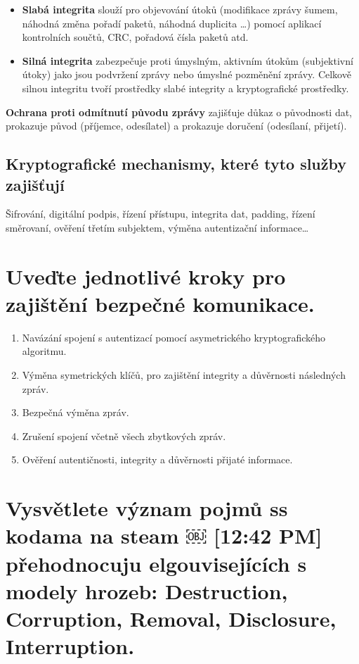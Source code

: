 \begin{itemize}
    \item \textbf{Slabá integrita} slouží pro objevování útoků (modifikace zprávy šumem, náhodná změna pořadí paketů, náhodná duplicita \dots) pomocí aplikací kontrolních součtů, CRC, pořadová čísla paketů atd.
    \item \textbf{Silná integrita} zabezpečuje proti úmyslným, aktivním útokům (subjektivní útoky) jako jsou podvržení zprávy nebo úmyslné pozměnění zprávy. Celkově silnou integritu tvoří prostředky slabé integrity a kryptografické prostředky.
\end{itemize}

\textbf{Ochrana proti odmítnutí původu zprávy} zajišťuje důkaz o původnosti dat, prokazuje původ (příjemce, odesílatel) a prokazuje doručení (odesílaní, přijetí).

\subsection{Kryptografické mechanismy, které tyto služby zajišťují}

Šifrování, digitální podpis, řízení přístupu, integrita dat, padding, řízení směrovaní, ověření třetím subjektem, výměna autentizační informace\dots

\section{Uveďte jednotlivé kroky pro zajištění bezpečné komunikace.}

\begin{enumerate}
     \item Navázání spojení s autentizací pomocí asymetrického kryptografického algoritmu.
    \item Výměna symetrických klíčů, pro zajištění integrity a důvěrnosti následných zpráv.
    \item Bezpečná výměna zpráv.
    \item Zrušení spojení včetně všech zbytkových zpráv.
    \item Ověření autentičnosti, integrity a důvěrnosti přijaté informace.
\end{enumerate}

\section{Vysvětlete význam pojmů ss kodama na steam ￼
[12:42 PM]
přehodnocuju elgouvisejících s modely hrozeb: Destruction, Corruption, Removal, Disclosure, Interruption.}

